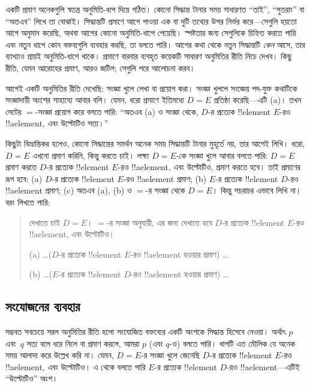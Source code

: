 \documentclass[../../../include/open-logic-section]{subfiles}
\begin{document}


একটি প্রমাণ অনেকগুলি স্বতন্ত্র অনুমিতি-ধাপ দিয়ে গঠিত।
কোনো সিদ্ধান্ত টানার সময় সাধারণত ``তাই'', ``সুতরাং'' বা
``অতএব'' লিখে তা বোঝাই। সিদ্ধান্তটি প্রমাণে আগে পাওয়া
এক বা দুটি তথ্যের উপর নির্ভর করে—সেগুলি হয়তো আগে
অনুমান করেছি, অথবা আগের কোনো অনুমিতি-ধাপে পেয়েছি।
স্পষ্টতার জন্য সেগুলিকে চিহ্নিত করতে পারি এবং নতুন ধাপে
কোন বক্তব্যগুলি ব্যবহার করছি, তা বলতে পারি। আগের কথা
থেকে নতুন সিদ্ধান্তটি \emph{কেন} আসে, তার ব্যাখ্যাও প্রায়ই
অনুমিতি-ধাপে থাকে। প্রমাণে বারবার ব্যবহৃত কয়েকটি সাধারণ
অনুমিতির রীতি নিচে দেখব। কিছু রীতি, যেমন আরোহের প্রমাণ,
আরও জটিল; সেগুলি পরে আলোচনা করব।

আগেই একটি অনুমিতির রীতি দেখেছি: সংজ্ঞা খুলে লেখা বা
প্রয়োগ করা। সংজ্ঞা খুললে সংজ্ঞেয় পদ-যুক্ত কথাটিকে
সংজ্ঞাদায়ী অংশের সাহায্যে আবার বলি। যেমন, ধরো প্রমাণে
ইতিমধ্যে $D = E$ প্রতিষ্ঠা করেছি—এটি (a)। তখন সেটের
$=$-সংজ্ঞা প্রয়োগ করে বলতে পারি: ``অতএব (a) ও সংজ্ঞা
থেকে, $D$-র প্রত্যেক !!{element} $E$-রও
!!a{element}, এবং উল্টোটিও সত্য।''

কিছুটা বিভ্রান্তিকর হলেও, কোনো সিদ্ধান্তের সমর্থন অনেক
সময় সিদ্ধান্তটি টানার মুহূর্তে নয়, তার আগেই লিখি। ধরো,
$D = E$ এখনো প্রমাণ করিনি, কিন্তু করতে চাই। লক্ষ্য
$D = E$-কে সংজ্ঞা খুলে আবার বলতে পারি: $D = E$
প্রমাণ করতে $D$-র প্রত্যেক !!{element} $E$-রও
!!a{element}, এবং উল্টোটিও, প্রমাণ করতে হবে। তাই
প্রমাণের রূপ হবে: (a) $D$-র প্রত্যেক !!{element}
$E$-রও !!a{element} প্রমাণ; (b) $E$-র প্রত্যেক
!!{element} $D$-রও !!a{element} প্রমাণ;
(c) অতএব (a), (b) ও $=$-র সংজ্ঞা থেকে $D = E$।
কিন্তু সচরাচর এভাবে লিখি না। বরং লিখতে পারি:
\begin{quote}
দেখাতে চাই $D = E$। $=$-র সংজ্ঞা অনুযায়ী, এর
জন্য দেখাতে হবে $D$-র প্রত্যেক !!{element} $E$-রও
!!a{element}, এবং উল্টোটিও।

(a) \dots ($D$-র প্রত্যেক !!{element} $E$-রও
!!a{element} হওয়ার প্রমাণ) \dots

(b) \dots ($E$-র প্রত্যেক !!{element} $D$-রও
!!a{element} হওয়ার প্রমাণ) \dots
\end{quote}

\subsection{সংযোজনের ব্যবহার}

সম্ভবত সবচেয়ে সরল অনুমিতির রীতি হলো সংযোজিত
বক্তব্যের একটি অংশকে সিদ্ধান্ত হিসেবে নেওয়া। অর্থাৎ
$p$ এবং~$q$ সত্য বলে ধরে নিলে বা প্রমাণ করলে,
আমরা $p$ (এবং $q$-ও) বলতে পারি। ধাপটি এত
মৌলিক যে অনেক সময় আলাদা করে উল্লেখ করি না।
যেমন, $D = E$-র সংজ্ঞা খুলে জেনেছি $D$-র প্রত্যেক
!!{element} $E$-রও !!a{element}, এবং উল্টোটিও।
এ থেকে বলতে পারি $E$-র প্রত্যেক !!{element}
$D$-রও !!a{element}—এটিই ``উল্টোটিও'' অংশ।
\end{document}
